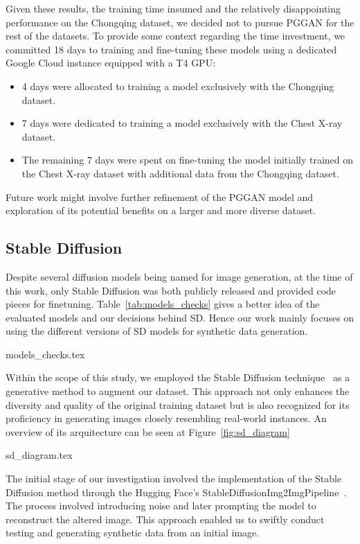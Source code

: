 Given these results, the training time insumed and the relatively disappointing performance on the Chongqing dataset, we decided not to pursue PGGAN for the rest of the datasets. To provide some context regarding the time investment, we committed 18 days to training and fine-tuning these models using a dedicated Google Cloud instance equipped with a T4 GPU:
\begin{itemize}
    \item 4 days were allocated to training a model exclusively with the Chongqing dataset.
    \item 7 days were dedicated to training a model exclusively with the Chest X-ray dataset.
    \item The remaining 7 days were spent on fine-tuning the model initially trained on the Chest X-ray dataset with additional data from the Chongqing dataset.
\end{itemize}
Future work might involve further refinement of the PGGAN model and exploration of its potential benefits on a larger and more diverse dataset.

\subsection{Stable Diffusion}

Despite several diffusion models being named for image generation, at the time of this work, only Stable Diffusion was both publicly released and provided code pieces for finetuning. Table~\ref{tab:models_checks} gives a better idea of the evaluated models and our decisions behind SD. Hence our work mainly focuses on using the different versions of SD models for synthetic data generation. 

{models_checks.tex}

Within the scope of this study, we employed the Stable Diffusion technique~\cite{stable_diffusion} as a generative method to augment our dataset. This approach not only enhances the diversity and quality of the original training dataset but is also recognized for its proficiency in generating images closely resembling real-world instances. An overview of its arquitecture can be seen at Figure~\ref{fig:sd_diagram}



{sd_diagram.tex}

The initial stage of our investigation involved the implementation of the Stable Diffusion method through the Hugging Face's StableDiffusionImg2ImgPipeline~\cite{huggingfaceImagetoImageGeneration}. The process involved introducing noise and later prompting the model to reconstruct the altered image. This approach enabled us to swiftly conduct testing and generating synthetic data from an initial image.

